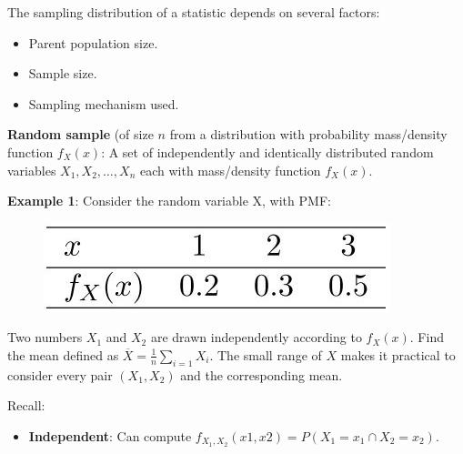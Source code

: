 \documentclass[10pt,a4paper]{article}
\begin{document}
The sampling distribution of a statistic depends on several factors:
\begin{itemize}
    \item Parent population size.
    \item Sample size.
    \item Sampling mechanism used.
\end{itemize}

\begin{tcolorbox}[breakable,colback=white]
\textbf{Random sample} (of size $n$ from a distribution with probability mass/density function
$f_X(x)$:  A set of independently and identically distributed random variables $X_1, X_2,\dots, X_n$ each with
mass/density function $f_X(x)$.
\end{tcolorbox}

\textbf{Example 1}: Consider the random variable X, with PMF: 
\begin{figure} [h!]
    \centering
    \includegraphics[scale=0.5]{Ex2.1 PMF.JPG}
\end{figure}

Two numbers $X_1$ and $X_2$ are drawn independently according to $f_X(x)$. Find the mean defined as
$\overline{X} = \frac{1}{n}\sum_{i=1}X_i$. The small range of $X$ makes it practical to consider
every pair $(X_1, X_2)$ and the corresponding mean.

Recall: 
\begin{itemize}
    \item \textbf{Independent}: Can compute $f_{X_1,X_2}(x1, x2) = P(X_1 = x_1 \cap X_2 = x_2)$.
\end{itemize}
\end{document}
